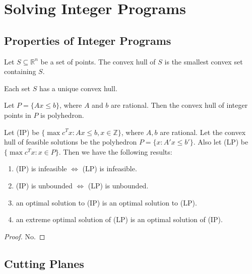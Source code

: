 \documentclass[a4paper]{report}
\begin{document}
	\newpage

	\section{Solving Integer Programs}
	\subsection{Properties of Integer Programs}
	\begin{definition}
		Let $S \subseteq \mathbb{R}^{n}$ be a set of points. The convex hull of $S$
		is the smallest convex set containing $S$.
		\begin{corollary}
			Each set $S$ has a unique convex hull.
		\end{corollary}
	\end{definition}

	\begin{theorem}
		Let $P = \{Ax \leq b\}$, where $A$ and $b$ are rational. Then the convex hull
		of integer points in $P$ is polyhedron.
	\end{theorem}

	\begin{theorem}
		Let (IP) be $\{\max c^{T}x : Ax \leq b, x \in \mathbb{Z}\}$, where $A, b$
		are rational. Let the convex hull of feasible solutions be the polyhedron $P
		=\{x : A' x \leq b'\}$. Also let (LP) be $\{\max c^{T} x : x \in P\}$. Then we
		have the following results:
		\begin{enumerate}
			\item (IP) is infeasible $\iff$ (LP) is infeasible.

			\item (IP) is unbounded $\iff$ (LP) is unbounded.

			\item an optimal solution to (IP) is an optimal solution to (LP).

			\item an extreme optimal solution of (LP) is an optimal solution of (IP).
		\end{enumerate}
		\begin{proof}
			No.
		\end{proof}
	\end{theorem}

	\subsection{Cutting Planes}
\end{document}
